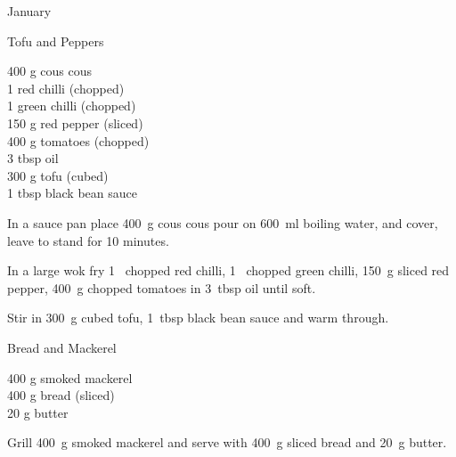 \begin{menu}{January}
    \begin{recipe}{2}{Tofu and Peppers}%
		\begin{ingredients}
		400 g cous cous  \\
	1  red chilli (chopped) \\
	1  green chilli (chopped) \\
	150 g red pepper (sliced) \\
	400 g tomatoes (chopped) \\
	3 tbsp oil  \\
	300 g tofu (cubed) \\
	1 tbsp black bean sauce  \\
	
		\end{ingredients}
	
    \begin{instructions}
    \item 
      In a
      sauce pan 
      place
      400~g  cous cous
      pour on
      600~ml  boiling water,
      and cover, leave to stand for 10 minutes.
    \item 
        In a large wok fry
        1~ chopped red chilli,
        1~ chopped green chilli,
        150~g sliced red pepper,
        400~g chopped tomatoes
        in
        3~tbsp  oil
        until soft.
      \item 
        Stir in
        300~g cubed tofu,
        1~tbsp  black bean sauce
        and warm through.
      
    \end{instructions}
    \end{recipe}%
  
    \begin{recipe}{1}{Bread and Mackerel}%
		\begin{ingredients}
		400 g smoked mackerel  \\
	400 g bread (sliced) \\
	20 g butter  \\
	
		\end{ingredients}
	
    \begin{instructions}
    \item 
        Grill
        400~g  smoked mackerel
        and serve with
        400~g sliced bread
        and
        20~g  butter.
      
    \end{instructions}
    \end{recipe}%
  
    \clearpage
    \end{menu}
	
